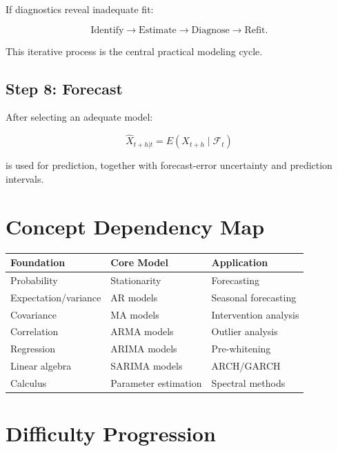 \documentclass[11pt]{article}
\begin{document}
If diagnostics reveal inadequate fit:

\[
\text{Identify}
\rightarrow
\text{Estimate}
\rightarrow
\text{Diagnose}
\rightarrow
\text{Refit}.
\]

This iterative process is the central practical modeling cycle.

\subsection*{Step 8: Forecast}

After selecting an adequate model:

\[
\widehat{X}_{t+h|t}
=
E(X_{t+h}\mid\mathcal{F}_t)
\]

is used for prediction, together with forecast-error uncertainty
and prediction intervals.

\section{Concept Dependency Map}

\begin{center}
\begin{tabular}{>{\raggedright\arraybackslash}p{}
                >{\raggedright\arraybackslash}p{}
                >{\raggedright\arraybackslash}p{}}
\toprule
\textbf{Foundation} & \textbf{Core Model} & \textbf{Application} \\
\midrule
Probability &
Stationarity &
Forecasting \\

Expectation/variance &
AR models &
Seasonal forecasting \\

Covariance &
MA models &
Intervention analysis \\

Correlation &
ARMA models &
Outlier analysis \\

Regression &
ARIMA models &
Pre-whitening \\

Linear algebra &
SARIMA models &
ARCH/GARCH \\

Calculus &
Parameter estimation &
Spectral methods \\
\bottomrule
\end{tabular}
\end{center}

\section{Difficulty Progression}
\end{document}
